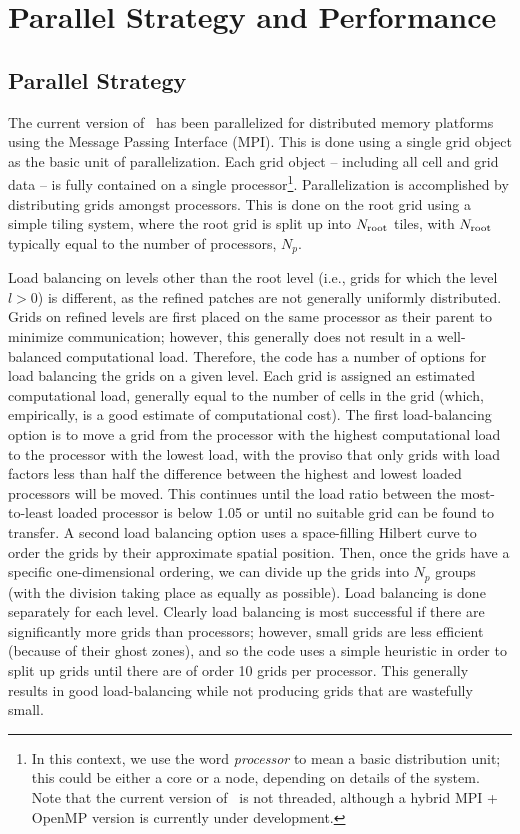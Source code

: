 \section{Parallel Strategy and Performance}
\label{sec.parallel}

\subsection{Parallel Strategy}

The current version of \enzo\ has been parallelized for distributed
memory platforms using the Message Passing Interface (MPI).  This is
done using a single grid object as the basic unit of parallelization.
Each grid object -- including all cell and grid data -- is fully
contained on a single processor\footnote{In this context, we use the
word {\it processor} to mean a basic distribution unit; this could be
either a core or a node, depending on details of the system.  Note
that the current version of \enzo\ is not threaded, although a hybrid
MPI + OpenMP version is currently under development.}.  
Parallelization is
accomplished by distributing grids amongst processors.  This is done
on the root grid using a simple tiling system, where the root grid is
split up into $N_{\rm root}$ tiles, with $N_{\rm root}$ typically
equal to the number of processors, $N_p$.

Load balancing on levels other than the root level (i.e., grids for
which the level $l > 0$) is different, as the refined patches are not
generally uniformly distributed.  Grids on refined levels are first
placed on the same processor as their parent to minimize
communication; however, this generally does not result in a
well-balanced computational load.  Therefore, the code has a number of options for
load balancing the grids on a given level. Each grid is assigned an
estimated computational load, generally equal to the number of cells in the grid (which,
empirically, is a good estimate of computational cost).  The first
load-balancing option is to move a grid from the processor with the
highest computational load to the processor with the lowest load, with the proviso
that only grids with load factors less than half the difference
between the highest and lowest loaded processors will be moved.  This
continues until the load ratio between the most-to-least loaded
processor is below 1.05 or until no suitable grid can be found to
transfer.  A second load balancing option uses a space-filling Hilbert
curve to order the grids by their approximate spatial position.  Then,
once the grids have a specific one-dimensional ordering, we can divide
up the grids into $N_p$ groups (with the division taking place as
equally as possible).  Load balancing is done separately for each
level.  Clearly load balancing is most successful if there are
significantly more grids than processors; however, small grids are
less efficient (because of their ghost zones), and so the code uses a
simple heuristic in order to split up grids until there are of order
10 grids per processor.  This generally results in good load-balancing
while not producing grids that are wastefully small.

